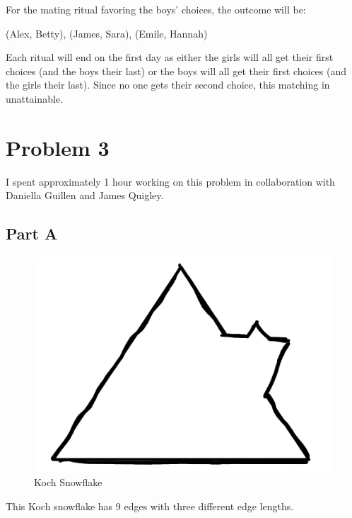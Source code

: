\documentclass{article}
\begin{document}
For the mating ritual favoring the boys' choices, the outcome will be:
\begin{center}
  (Alex, Betty), (James, Sara), (Emile, Hannah)
\end{center}

Each ritual will end on the first day as either the girls will all get their
first choices (and the boys their last) or the boys will all get their first
choices (and the girls their last). Since no one gets their second choice, this
matching in unattainable.

\bigbreak
\bigbreak
\bigbreak
\bigbreak
\bigbreak

\section*{Problem 3}

I spent approximately 1 hour working on this problem in collaboration with
Daniella Guillen and James Quigley.

\subsection*{Part A}

\begin{figure}[H]
  \centering
  \includegraphics[scale=0.70]{"KochSnowflake"}
  \caption{Koch Snowflake}
\end{figure}

This Koch snowflake has 9 edges with three different edge lengths.

\bigbreak
\bigbreak
\bigbreak
\bigbreak
\bigbreak
\bigbreak
\bigbreak
\bigbreak
\bigbreak
\bigbreak
\bigbreak
\bigbreak
\bigbreak
\bigbreak
\bigbreak
\bigbreak
\bigbreak
\end{document}
